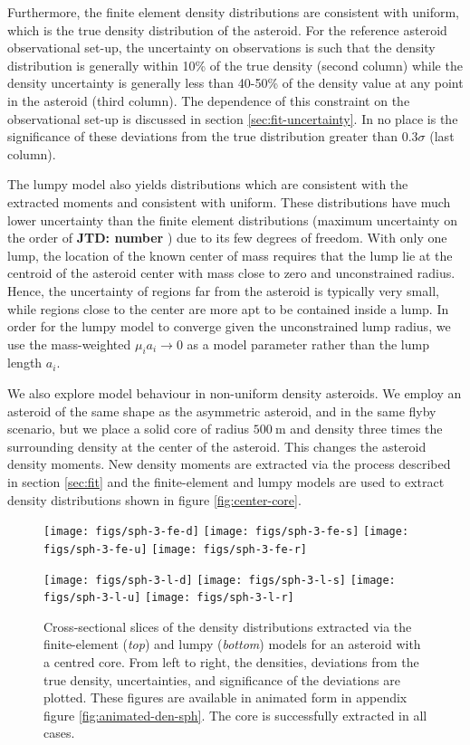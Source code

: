\documentclass[fleqn,usenatbib]{mnras}
\newcommand{\jtd}[1]{ {\bf{\color{red} JTD: #1}} }
\begin{document}
Furthermore, the finite element density distributions are consistent with uniform, which is the true density distribution of the asteroid. For the reference asteroid observational set-up, the uncertainty on observations is such that the density distribution is generally within 10\% of the true density (second column) while the density uncertainty is generally less than 40-50\% of the density value at any point in the asteroid (third column). The dependence of this constraint on the observational set-up is discussed in section \ref{sec:fit-uncertainty}. In no place is the significance of these deviations from the true distribution greater than $0.3 \sigma$ (last column).

The lumpy model also yields distributions which are consistent with the extracted moments and consistent with uniform. These distributions have much lower uncertainty than the finite element distributions (maximum uncertainty on the order of \jtd{number}) due to its few degrees of freedom. With only one lump, the location of the known center of mass requires that the lump lie at the centroid of the asteroid center with mass close to zero and unconstrained radius. Hence, the uncertainty of regions far from the asteroid is typically very small, while regions close to the center are more apt to be contained inside a lump. In order for the lumpy model to converge given the unconstrained lump radius, we use the mass-weighted $\mu_i a_i \rightarrow 0$ as a model parameter rather than the lump length $a_i$.

We also explore model behaviour in non-uniform density asteroids. We employ an asteroid of the same shape as the asymmetric asteroid, and in the same flyby scenario, but we place a solid core of radius $\SI{500}{\meter}$ and density three times the surrounding density at the center of the asteroid. This changes the asteroid density moments. New density moments are extracted via the process described in section \ref{sec:fit} and the finite-element and lumpy models are used to extract density distributions shown in figure \ref{fig:center-core}.
\begin{figure}
  \texttt{[image: figs/sph-3-fe-d]}\hfill
  \texttt{[image: figs/sph-3-fe-s]}\hfill
  \texttt{[image: figs/sph-3-fe-u]}\hfill
  \texttt{[image: figs/sph-3-fe-r]}

  \texttt{[image: figs/sph-3-l-d]}\hfill
  \texttt{[image: figs/sph-3-l-s]}\hfill
  \texttt{[image: figs/sph-3-l-u]}\hfill
  \texttt{[image: figs/sph-3-l-r]}

  \caption{Cross-sectional slices of the density distributions extracted via the finite-element (\textit{top}) and lumpy (\textit{bottom}) models for an asteroid with a centred core. From left to right, the densities, deviations from the true density, uncertainties, and significance of the deviations are plotted. These figures are available in animated form in appendix figure \ref{fig:animated-den-sph}. The core is successfully extracted in all cases.}
  \label{fig:den-sph}
\end{figure}
\end{document}
